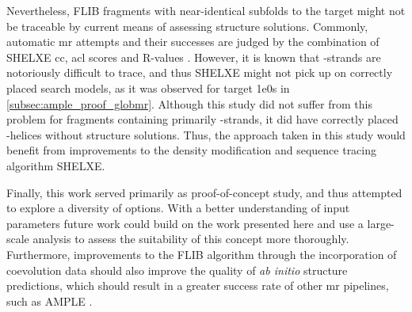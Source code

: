 Nevertheless, FLIB fragments with near-identical subfolds to the target might not be traceable by current means of assessing structure solutions. Commonly, automatic \gls{mr} attempts and their successes are judged by the combination of SHELXE \gls{cc}, \gls{acl} scores and R-values \cite{Thorn2013-le}. However, it is known that \textbeta-strands are notoriously difficult to trace, and thus SHELXE might not pick up on correctly placed search models, as it was observed for target 1e0s in \cref{subsec:ample_proof_globmr}. Although this study did not suffer from this problem for fragments containing primarily \textbeta-strands, it did have correctly placed \textalpha-helices without structure solutions. Thus, the approach taken in this study would benefit from improvements to the density modification and sequence tracing algorithm SHELXE.

Finally, this work served primarily as proof-of-concept study, and thus attempted to explore a diversity of options. With a better understanding of input parameters future work could build on the work presented here and use a large-scale analysis to assess the suitability of this concept more thoroughly. Furthermore, improvements to the FLIB algorithm through the incorporation of coevolution data should also improve the quality of \textit{ab initio} structure predictions, which should result in a greater success rate of other \gls{mr} pipelines, such as AMPLE \cite{Bibby2012-lm}.
